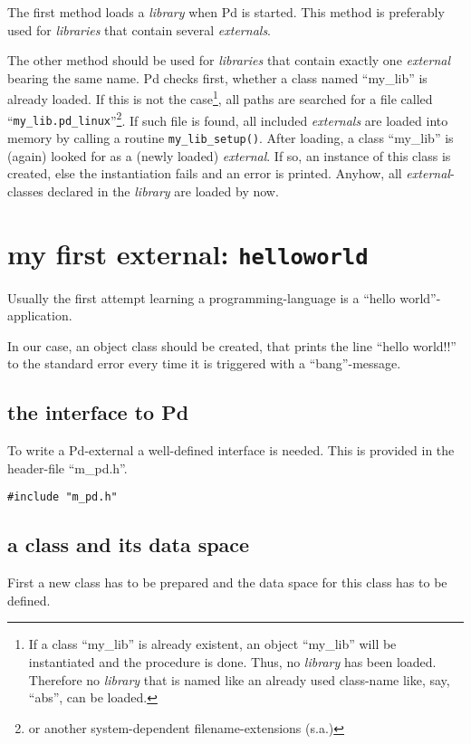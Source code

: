 \documentclass[12pt, a4paper,english,titlepage]{article}
\begin{document}
The first method loads a {\em library} when Pd is started.
This method is preferably used for {\em libraries} that contain several {\em externals}.

The other method should be used for {\em libraries} that contain exactly
one {\em external} bearing the same name.
Pd checks first, whether a class named ``my\_lib'' is already loaded.
If this is not the case\footnote{
If a class ``my\_lib'' is already existent, an object ``my\_lib'' will be instantiated
and the procedure is done. 
Thus, no {\em library} has been loaded.
Therefore no {\em library} that is named like an already used class-name like, say, ``abs'',
can be loaded.}, all paths are searched for a file called
``{\tt my\_lib.pd\_linux}''\footnote{or another system-dependent filename-extensions (s.a.)}.
If such file is found, all included {\em externals} are loaded into memory by calling a
routine \verb+my_lib_setup()+.
After loading, a class ``my\_lib'' is (again) looked for as a (newly loaded) {\em external}.
If so, an instance of this class is created, else the instantiation fails and an error is
printed.
Anyhow, all {\em external}-classes declared in the {\em library} are loaded by now.


\section{my first external: {\tt helloworld}}
Usually the first attempt learning a programming-language is a ``hello world''-application.

In our case, an object class should be created, that prints the line ``hello world!!'' to
the standard error every time it is triggered with a ``bang''-message.



\subsection{the interface to Pd}
To write a Pd-external a well-defined interface is needed.
This is provided in the header-file ``m\_pd.h''.

\begin{verbatim}
#include "m_pd.h"
\end{verbatim}

\subsection{a class and its data space}
First a new class has to be prepared and the data space for this class has to be defined.
\end{document}
